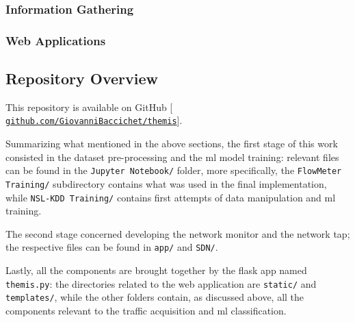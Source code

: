 \subsubsection{Information Gathering}
\label{subsubsec:information-gathering}
\textcolor{dimgray}{\lipsum[1]}

\subsubsection{Web Applications}
\label{subsubsec:web-applications}
\textcolor{dimgray}{\lipsum[1]}


\newpage

\subsection{Repository Overview}
\label{subsec:repository}

This repository is available on GitHub [{\fontsize{7}{7}\faExternalLink*[regular]} \href{https://github.com/GiovanniBaccichet/themis/}{\texttt{github.com/GiovanniBaccichet/themis}}].
\par Summarizing what mentioned in the above sections, the first stage of this work consisted in the dataset pre-processing and the \gls{ml} model training: relevant files can be found in the \texttt{Jupyter Notebook/} folder, more specifically, the \texttt{FlowMeter Training/} subdirectory contains what was used in the final implementation, while \texttt{NSL-KDD Training/} contains first attempts of data manipulation and \gls{ml} training.
\par The second stage concerned developing the network monitor and the network \gls{tap}; the respective files can be found in \texttt{app/} and \texttt{SDN/}.
\par Lastly, all the components are brought together by the flask app named \texttt{themis.py}: the directories related to the web application are \texttt{static/} and \texttt{templates/}, while the other folders contain, as discussed above, all the components relevant to the traffic acquisition and \gls{ml} classification. 


